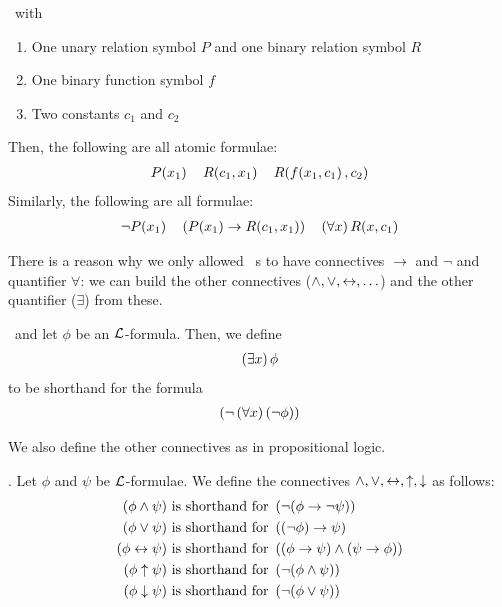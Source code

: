 \begin{boxexample}
    \ with
    \begin{enumerate}
        \item One unary relation symbol $P$ and one binary relation symbol $R$
        \item One binary function symbol $f$
        \item Two constants $c_1$ and $c_2$
    \end{enumerate}
    Then, the following are all atomic formulae:
    \begin{align*}
        P\!\left( x_1 \right) \quad R\!\left( c_1, x_1 \right) \quad R\!\left( f\!\left( x_1, c_1 \right), c_2 \right)
    \end{align*}
    Similarly, the following are all formulae:
    \begin{align*}
        \neg P\!\left( x_1 \right) \quad \left( P\!\left( x_1 \right) \to R\!\left( c_1, x_1 \right) \right) \quad \left( \forall x \right) R\!\left( x, c_1 \right)
    \end{align*}
\end{boxexample}

There is a reason why we only allowed \fola~s to have connectives $\to$ and $\neg$ and quantifier $\forall$: we can build the other connectives ($\land, \lor, \leftrightarrow, \ldots$) and the other quantifier ($\exists$) from these.

\begin{boxdefinition}
    \ and let $\phi$ be an $\mathcal{L}$-formula. Then, we define
    \begin{align*}
        \left( \exists x \right) \phi
    \end{align*}
    to be shorthand for the formula
    \begin{align*}
        \left( \neg\left( \forall x \right)\left( \neg \phi \right) \right)
    \end{align*}
\end{boxdefinition}

We also define the other connectives as in propositional logic.

\begin{boxdefinition}[Connectives]
    . Let $\phi$ and $\psi$ be $\mathcal{L}$-formulae. We define the connectives $\land, \lor, \leftrightarrow, \uparrow, \downarrow$ as follows:
    \begin{align*}
        \left( \phi \land \psi \right) &\text{ is shorthand for } \left( \neg (\phi \to \neg \psi) \right) \\
        \left( \phi \lor \psi \right) &\text{ is shorthand for } \left( \left( \neg \phi \right) \to \psi \right) \\
        \left( \phi \leftrightarrow \psi \right) &\text{ is shorthand for } \left( (\phi \to \psi) \land (\psi \to \phi) \right) \\
        \left( \phi \uparrow \psi \right) &\text{ is shorthand for } \left( \neg (\phi \land \psi) \right) \\
        \left( \phi \downarrow \psi \right) &\text{ is shorthand for } \left( \neg (\phi \lor \psi) \right)
    \end{align*}
\end{boxdefinition}

